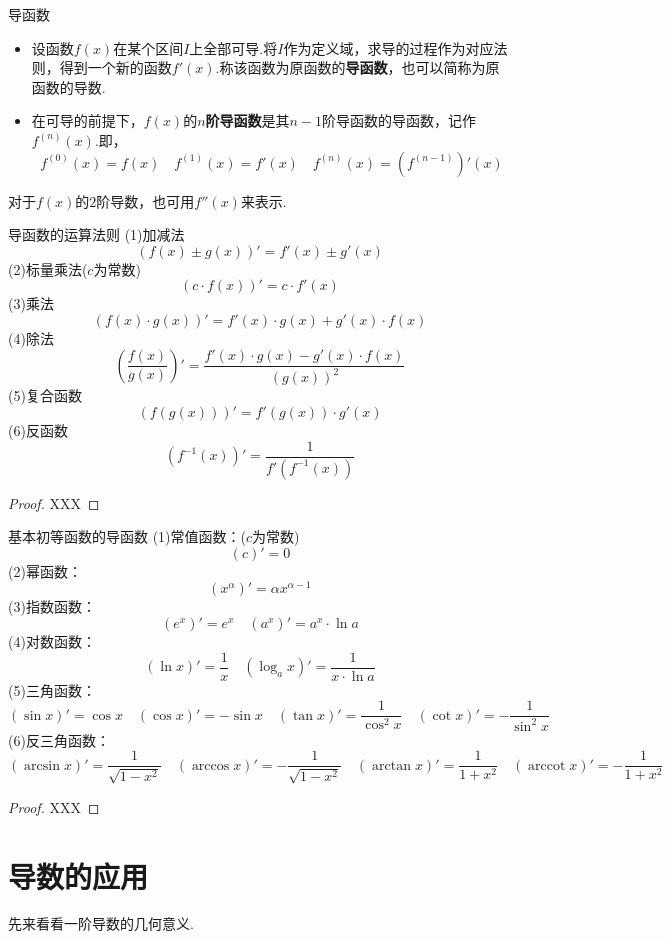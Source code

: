 \documentclass[lang=cn, zihao=5]{elegantbook}
\newcommand{\ssb}[1]{\left( #1 \right)}
\DeclareMathOperator{\arccot}{arccot}
\begin{document}
\begin{definition}{导函数}
	\begin{itemize}
		\item 设函数$f(x)$在某个区间$I$上全部可导.将$I$作为定义域，求导的过程作为对应法则，得到一个新的函数$f'(x)$.称该函数为原函数的\textbf{导函数}，也可以简称为原函数的导数.
		\item 在可导的前提下，$f(x)$的\textbf{$n$阶导函数}是其$n-1$阶导函数的导函数，记作$f^{(n)}(x)$.即，$$f^{(0)}(x)=f(x) \quad f^{(1)}(x)=f'(x) \quad f^{(n)}(x)=(f^{(n-1)})'(x)$$
	\end{itemize}
\end{definition}
\begin{remark}
	对于$f(x)$的$2$阶导数，也可用$f''(x)$来表示.
\end{remark}

\begin{theorem}{导函数的运算法则}
	(1)加减法$$(f(x) \pm g(x))'=f'(x) \pm g'(x)$$
	(2)标量乘法($c$为常数)$$(c \cdot f(x))'=c \cdot f'(x)$$
	(3)乘法$$(f(x) \cdot g(x))'=f'(x) \cdot g(x) + g'(x) \cdot f(x)$$
	(4)除法$$\ssb{ \frac{f(x)}{g(x)} }'=\frac{f'(x) \cdot g(x) - g'(x) \cdot f(x)}{(g(x))^2}$$
	(5)复合函数$$(f(g(x)))'=f'(g(x)) \cdot g'(x)$$
	(6)反函数$$(f^{-1}(x))'=\frac{1}{f'(f^{-1}(x))}$$
\end{theorem}
\begin{proof}
	XXX
\end{proof}

\begin{proposition}{基本初等函数的导函数}
	(1)常值函数：($c$为常数)$$(c)'=0$$
	(2)幂函数：$$(x^{\alpha})'=\alpha x^{\alpha -1}$$
	(3)指数函数：$$(e^x)'=e^x \quad (a^x)'=a^x \cdot \ln a$$
	(4)对数函数：$$(\ln x)'=\frac{1}{x} \quad (\log_{a}{x})'=\frac{1}{x\cdot \ln a}$$
	(5)三角函数：$$(\sin x)'=\cos x \quad (\cos x)'=-\sin x \quad (\tan x)'=\frac{1}{\cos ^2 x} \quad (\cot x)'=-\frac{1}{\sin ^2 x}$$
	(6)反三角函数：$$(\arcsin x)'=\frac{1}{\sqrt{1-x^2}} \quad (\arccos x)'=-\frac{1}{\sqrt{1-x^2}} \quad (\arctan x)'=\frac{1}{1+x^2} \quad (\arccot x)'=-\frac{1}{1+x^2}$$
\end{proposition}
\begin{proof}
	XXX
\end{proof}

\section{导数的应用}

先来看看一阶导数的几何意义.
\end{document}
